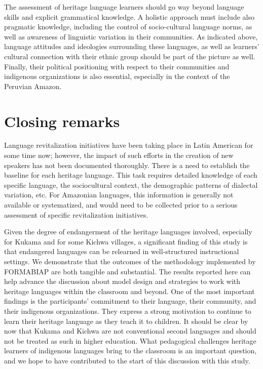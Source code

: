 \documentclass[output=paper]{langscibook}
\begin{document}
The assessment of heritage language learners should go way beyond language skills and explicit grammatical knowledge. A holistic approach must include also pragmatic knowledge, including the control of socio-cultural language norms, as well as awareness of linguistic variation in their communities. As indicated above, language attitudes and ideologies surrounding these languages, as well as learners’ cultural connection with their ethnic group should be part of the picture as well. Finally, their political positioning with respect to their communities and indigenous organizations is also essential, especially in the context of the Peruvian Amazon.


\section{Closing remarks}\label{sec:7:8}

Language revitalization initiatives have been taking place in Latin American for some time now; however, the impact of such efforts in the creation of new speakers has not been documented thoroughly. There is a need to establish the baseline for each heritage language. This task requires detailed knowledge of each specific language, the sociocultural context, the demographic patterns of dialectal variation, etc. For Amazonian languages, this information is generally not available or systematized, and would need to be collected prior to a serious assessment of specific revitalization initiatives.

Given the degree of endangerment of the heritage languages involved, especially for Kukama and for some Kichwa villages, a significant finding of this study is that endangered languages can be relearned in well-structured instructional settings. We demonstrate that the outcomes of the methodology implemented by FORMABIAP are both tangible and substantial. The results reported here can help advance the discussion about model design and strategies to work with heritage languages within the classroom and beyond. One of the most important findings is the participants’ commitment to their language, their community, and their indigenous organizations. They express a strong motivation to continue to learn their heritage language as they teach it to children. It should be clear by now that Kukama and \textsc{K}ichwa are not conventional second languages and should not be treated as such in higher education. What pedagogical challenges heritage learners of indigenous languages bring to the classroom is an important question, and we hope to have contributed to the start of this discussion with this study.
\end{document}
